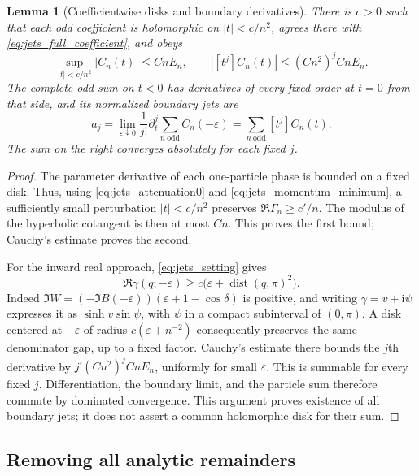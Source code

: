 \documentclass[11pt]{article}
\numberwithin{equation}{section}
\newtheorem{lemma}[theorem]{Lemma}
\theoremstyle{definition}
\newcommand{\ii}{\mathrm i}
\newcommand{\eps}{\varepsilon}
\newcommand{\dist}{\operatorname{dist}}
\begin{document}
\begin{lemma}[Coefficientwise disks and boundary derivatives]
\label{lem:jets_boundary_derivatives}
There is $c>0$ such that each odd coefficient is holomorphic on
$|t|<c/n^2$, agrees there with \eqref{eq:jets_full_coefficient}, and
obeys
\begin{equation}\label{eq:jets_small_disk}
 \sup_{|t|<c/n^2}|C_n(t)|\le CnE_n,
 \qquad |[t^j]C_n(t)|\le (Cn^2)^j CnE_n.
\end{equation}
The complete odd sum on $t<0$ has derivatives of every fixed order at
$t=0$ from that side, and its normalized boundary jets are
\begin{equation}\label{eq:jets_boundary_coefficients}
 a_j=\lim_{\eps\downarrow0}\frac1{j!}
       \partial_t^j\sum_{n\ \mathrm{odd}}C_n(-\eps)
     =\sum_{n\ \mathrm{odd}}[t^j]C_n(t).
\end{equation}
The sum on the right converges absolutely for each fixed $j$.
\end{lemma}

\begin{proof}
The parameter derivative of each one-particle phase is bounded on a
fixed disk. Thus, using \eqref{eq:jets_attenuation0} and
\eqref{eq:jets_momentum_minimum}, a sufficiently small perturbation
$|t|<c/n^2$ preserves $\Re\Gamma_n\ge c'/n$. The modulus of the
hyperbolic cotangent is then at most $Cn$. This proves the first bound;
Cauchy's estimate proves the second.

For the inward real approach, \eqref{eq:jets_setting} gives
\[
 \Re\gamma(q;-\eps)\ge
 c\bigl(\eps+\dist(q,\pi)^2\bigr).
\]
Indeed $\Im W=(-\Im B(-\eps))(\eps+1-\cos\delta)$ is positive,
and writing $\gamma=v+\ii\psi$ expresses it as
$\sinh v\sin\psi$, with $\psi$ in a compact subinterval of
$(0,\pi)$. A disk centered at $-\eps$ of radius
$c(\eps+n^{-2})$ consequently preserves the same denominator gap,
up to a fixed factor. Cauchy's estimate there bounds the $j$th
derivative by $j!(Cn^2)^j CnE_n$, uniformly for small $\eps$.
This is summable for every fixed $j$. Differentiation, the boundary
limit, and the particle sum therefore commute by dominated
convergence. This argument proves existence of all boundary jets; it
does not assert a common holomorphic disk for their sum.
\end{proof}

\subsection{Removing all analytic remainders}
\end{document}
